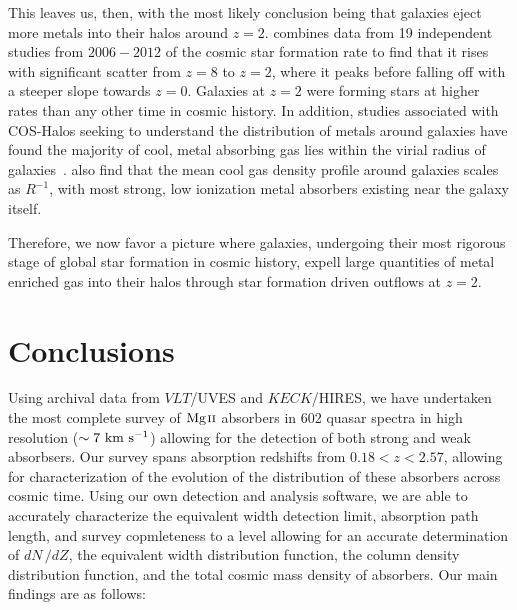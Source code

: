 \documentclass[iop,apj,numberedappendix,appendixfloats,twocolappendix]{emulateapj}
\begin{document}
This leaves us, then, with the most likely conclusion being that galaxies eject more metals into their halos around $z = 2$. \cite{Behroozi2013sfr} combines data from 19 independent studies from $2006-2012$ of the cosmic star formation rate to find that it rises with significant scatter from $z=8$ to $z=2$, where it peaks before falling off with a steeper slope towards $z = 0$. Galaxies at $z=2$ were forming stars at higher rates than any other time in cosmic history. In addition, studies associated with COS-Halos seeking to understand the distribution of metals around galaxies have found the majority of cool, metal absorbing gas lies within the virial radius of galaxies~\citep{Peeples2014}. \cite{Stern2016} also find that the mean cool gas density profile around galaxies scales as $R^{-1}$, with most strong, low ionization metal absorbers existing near the galaxy itself. 

Therefore, we now favor a picture where galaxies, undergoing their most rigorous stage of global star formation in cosmic history, expell large quantities of metal enriched gas into their halos through star formation driven outflows at $z = 2$. 


\section{Conclusions}
\label{sec:conclusions}

Using archival data from $VLT$/UVES and $KECK$/HIRES, we have undertaken the most complete survey of ${\hbox{{\rm Mg}\kern 0.1em{\sc ii}}}$ absorbers in 602 quasar spectra in high resolution ($\sim 7~\mathrm{\hbox{km~s$^{-1}$}}$) allowing for the detection of both strong and weak {\MgII} absorbsers. Our survey spans absorption redshifts from $0.18 < z < 2.57$, allowing for characterization of the evolution of the distribution of these absorbers across cosmic time. Using our own detection and analysis software, we are able to accurately characterize the equivalent width detection limit, absorption path length, and survey copmleteness to a level allowing for an accurate determination of $dN\,/dZ$, the equivalent width distribution function, the column density distribution function, and the total cosmic mass density of {\MgII} absorbers. Our main findings are as follows:
\end{document}
